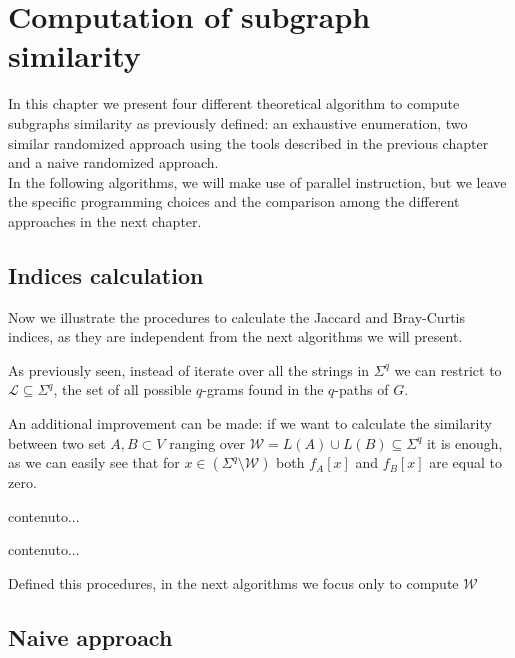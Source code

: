 \chapter{Computation of subgraph similarity}

	In this chapter we present four different theoretical algorithm to compute subgraphs similarity as previously defined: an exhaustive enumeration, two similar randomized approach using the tools described in the previous chapter and a naive randomized approach.\\
	
	In the following algorithms, we will make use of parallel instruction, but we leave the specific programming choices and the comparison among the different approaches in the next chapter.
	
\section{Indices calculation}

Now we illustrate the procedures to calculate the Jaccard and Bray-Curtis indices, as they are independent from the next algorithms we will present.

As previously seen, instead of iterate over all the strings in $\Sigma^{q}$ we can restrict to $\mathcal{L} \subseteq \Sigma^{q}$, the set of all possible $q$-grams found in the $q$-paths of $G$. 

An additional improvement can be made: if we want to calculate the similarity between two set $A, B \subset V$ ranging over $\mathcal{W} = L(A) \cup L(B) \subseteq \Sigma^{q}$ it is enough, as we can easily see that for $x \in ( \Sigma^{q} \setminus \mathcal{W} )$ both $f_A[x]$ and $f_B[x]$ are equal to zero.

\begin{algorithm}
	contenuto...
\end{algorithm}

\begin{algorithm}
	contenuto...
\end{algorithm}

Defined this procedures, in the next algorithms we focus only to compute $\mathcal{W}$ 

\section{Naive approach}

